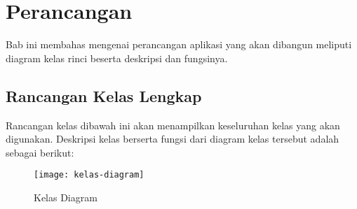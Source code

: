 \chapter{Perancangan}
\label{sec:perancangan}

Bab ini membahas mengenai perancangan aplikasi yang akan dibangun meliputi diagram kelas rinci beserta deskripsi dan fungsinya.

\section{Rancangan Kelas Lengkap}
\label{sec:kelaslengkap}
Rancangan kelas dibawah ini akan menampilkan keseluruhan kelas yang akan digunakan. Deskripsi kelas berserta fungsi dari diagram kelas tersebut adalah sebagai berikut:

\begin{figure}[H]
	\centering  
	\texttt{[image: kelas-diagram]}  
	\caption[Kelas Diagram]{Kelas Diagram} 
	\label{fig:kelas-diagram} 
\end{figure} 

